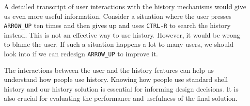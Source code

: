 A detailed transcript of user interactions with the history mechanisms would give us even more useful information. Consider a situation where the user presses \verb|ARROW_UP| ten times and then gives up and uses \verb|CTRL-R| to search the history instead. This is not an effective way to use history. However, it would be wrong to blame the user. If such a situation happens a lot to many users, we should look into if we can redesign \verb|ARROW_UP| to improve it.

The interactions between the user and the history features can help us understand how people use history. Knowing how people use standard shell history and our history solution is essential for informing design decisions. It is also crucial for evaluating the performance and usefulness of the final solution. %
